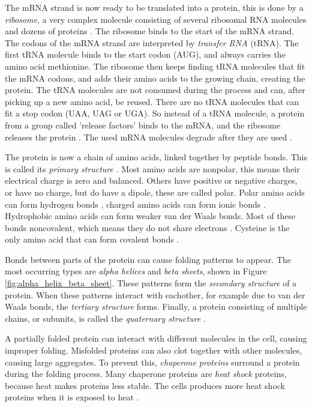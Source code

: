 \documentclass[../main/thesis.tex]{subfiles}
\begin{document}
The mRNA strand is now ready to be translated into a protein, this is done by a \textit{ribosome}, a very complex molecule consisting of several ribosomal RNA molecules and dozens of proteins \cite{DNA_translation1}.
The ribosome binds to the start of the mRNA strand.
The codons of the mRNA strand are interpreted by \textit{transfer RNA} (tRNA).
The first tRNA molecule binds to the start codon (AUG), and always carries the amino acid methionine.
The ribosome then keeps finding tRNA molecules that fit the mRNA codons, and adds their amino acids to the growing chain, creating the protein.
The tRNA molecules are not consumed during the process and can, after picking up a new amino acid, be reused.
There are no tRNA molecules that can fit a stop codon (UAA, UAG or UGA).
So instead of a tRNA molecule, a protein from a group called 'release factors' binds to the mRNA, and the ribosome releases the protein \cite{DNA_translation2}.
The used mRNA molecules degrade after they are used \cite{mRNA_degradation}.

The protein is now a chain of amino acids, linked together by peptide bonds.
This is called its \textit{primary structure} \cite{protein_structures}.
Most amino acids are nonpolar, this means their electrical charge is zero and balanced.
Others have positive or negative charges, or have no charge, but do have a dipole, these are called polar.
Polar amino acids can form hydrogen bonds \cite{hydrogen_bond}, charged amino acids can form ionic bonds \cite{ionic_bond}.
Hydrophobic amino acids can form weaker van der Waals bonds.
Most of these bonds noncovalent, which means they do not share electrons \cite{ionic_bond}.
Cysteine is the only amino acid that can form covalent bonds \cite{protein_structures}.

Bonds between parts of the protein can cause folding patterns to appear.
The most occurring types are \textit{alpha helices} and \textit{beta sheets}, shown in Figure \ref{fig:alpha_helix_beta_sheet}.
These patterns form the \textit{secondary structure} of a protein.
When these patterns interact with eachother, for example due to van der Waals bonds, the \textit{tertiary structure} forms.
Finally, a protein consisting of multiple chains, or subunits, is called the \textit{quaternary structure} \cite{protein_structures}.


A partially folded protein can interact with different molecules in the cell, causing improper folding.
Misfolded proteins can also clot together with other molecules, causing large aggregates.
To prevent this, \textit{chaperone proteins} surround a protein during the folding process.
Many chaperone proteins are \textit{heat shock} proteins, because heat makes proteins less stable.
The cells produces more heat shock proteins when it is exposed to heat \cite{chaperone_protein}.
\end{document}

